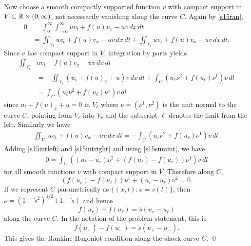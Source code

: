 Now choose a smooth compactly supported function $v$ with compact support in $V \subset \mathbb{R} \times (0, \infty)$, not necessarily vanishing along
the curve $C$. Again by \eqref{s15ran},
\begin{equation}
\begin{aligned}\label{s15sumint}
0 &= \int_{0}^{\infty}\int_{-\infty}^{\infty}uv_{t} + f(u)v_{x} - uv\, dx\, dt\\
& = \iint_{V_{\ell}}uv_{t} + f(u)v_{x} - uv\, dx\, dt + \iint_{V_{r}}uv_{t} + f(u)v_{x} - uv\, dx\, dt.
\end{aligned}
\end{equation}
Since $v$ has compact support in $V$, integration by parts yields
\begin{equation}
\begin{aligned}\label{s15intleft}
\iint_{V_{\ell}}&uv_{t} + f(u)v_{x} - uv\, dx\, dt\\
 &= -\iint_{V_{\ell}}(u_{t} + f(u)_{x} + u)v\, dx\, dt + \int_{C}(u_{\ell}\nu^{2} + f(u_{\ell})\nu^{1})v\, dl\\
&= \int_{C}(u_{\ell}\nu^{2} + f(u_{\ell})\nu^{1})v\, dl
\end{aligned}
\end{equation}
since $u_{t} + f(u)_{x} + u = 0$ in $V_{\ell}$ where $\nu = (\nu^{1}, \nu^{2})$ is the unit normal to the curve $C$, pointing from $V_{\ell}$ into $V_{r}$
and the subscript $\ell$ denotes the limit from the left. Similarly we have
\begin{align}\label{s15intright}
\iint_{V_{r}}uv_{t} + f(u)v_{x} - uv\, dx\, dt = -\int_{C}(u_{r}\nu^{2} + f(u_{r})\nu^{1})v\, dl.
\end{align}
Adding \eqref{s15intleft} and \eqref{s15intright} and using \eqref{s15sumint}, we have
\begin{align*}
0 = \int_{C}((u_{\ell} - u_{r})\nu^{2} + (f(u_{\ell}) - f(u_{r}))\nu^{1})v\, dl
\end{align*}
for all smooth functions $v$ with compact support in $V$. Therefore
along $C$,
$$(f(u_{r}) - f(u_{\ell}))\nu^{1} + (u_{r} - u_{\ell})\nu^{2} = 0.$$
If we represent $C$ parametrically as $\{(x, t): x = s(t)\}$, then $\nu = (1 + \dot{s}^{2})^{1/2}(1, -\dot{s})$
and hence
$$f(u_{r}) - f(u_{\ell}) = \dot{s}(u_{r} - u_{\ell})$$
along the curve $C$. In the notation of the problem statement, this is
$$f(u_{+}) - f(u_{-}) = \dot{s}(u_{+} - u_{-}).$$
This gives the Rankine-Hugoniot condition along the shock curve $C$.
\hfill\qed

